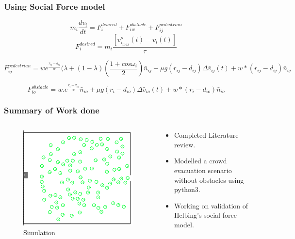 \documentclass{beamer}
\begin{document}
\begin{frame}
\frametitle{Using Social Force model}
  \[m_i\frac{d v_i}{dt} = F_i^{desired}+F_{iw}^{obstacle}+F_{ij}^{pedestrian}\]
      \[F_i^{desired}=m_i \frac{[v_{i_{max}}^o(t)-v_i(t)]}{\tau}\]

    \small \[F_{ij}^{pedestrian}=we^{\frac{r_{ij}-d_{ij}}{w}}(\lambda+(1-\lambda)(\frac{1+cos\omega_i}{2}) \bar n_{ij} + \mu g(r_{ij}-d_{ij}) \Delta \bar v_{ij}(t)+w*(r_{ij}-d_{ij}) \bar n_{ij} \]
        
      \[F_{io}^{obstacle}=w.e^{\frac{r_{i}-d_{io}}{w}} \bar n_{io} + \mu g(r_{i}-d_{io}) \Delta \bar v_{io}(t)  + w*(r_{i}-d_{io}) \bar n_{io} \]

\end{frame}

\begin{frame}    \frametitle{Summary of Work done}
\begin{columns}
\begin{column}{0.4\textwidth}
    \begin{figure}
    \centering
        \includegraphics[width=1\textwidth]{work_summary.png}
        \caption{Simulation}
    \end{figure}
\end{column}
\begin{column}{0.6\textwidth}
	\begin{itemize}
		\item Completed Literature review.
		\item Modelled a crowd evacuation scenario without obstacles using python3.
		\item Working on validation of Helbing's social force model.
	\end{itemize}
\end{column}
\end{columns}

\end{frame}
\end{document}
